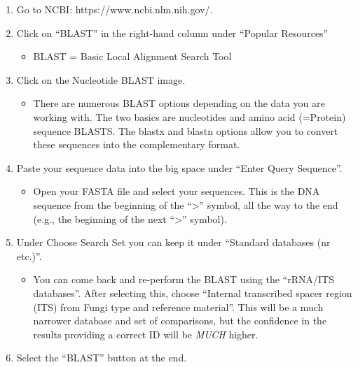 \documentclass[
  letterpaper,
  DIV=11,
  numbers=noendperiod]{scrreprt}
\providecommand{\tightlist}{%
  \setlength{\itemsep}{0pt}\setlength{\parskip}{0pt}}
\begin{document}
\begin{enumerate}
\def\labelenumi{\arabic{enumi}.}
\tightlist
\item
  Go to NCBI: https://www.ncbi.nlm.nih.gov/.
\item
  Click on ``BLAST'' in the right-hand column under ``Popular
  Resources''

  \begin{itemize}
  \tightlist
  \item
    BLAST = Basic Local Alignment Search Tool
  \end{itemize}
\item
  Click on the Nucleotide BLAST image.

  \begin{itemize}
  \tightlist
  \item
    There are numerous BLAST options depending on the data you are
    working with. The two basics are nucleotides and amino acid
    (=Protein) sequence BLASTS. The blastx and blastn options allow you
    to convert these sequences into the complementary format.
  \end{itemize}
\item
  Paste your sequence data into the big space under ``Enter Query
  Sequence''.

  \begin{itemize}
  \tightlist
  \item
    Open your FASTA file and select your sequences. This is the DNA
    sequence from the beginning of the ``\textgreater{}'' symbol, all
    the way to the end (e.g., the beginning of the next
    ``\textgreater{}'' symbol).
  \end{itemize}
\item
  Under Choose Search Set you can keep it under ``Standard databases (nr
  etc.)''.

  \begin{itemize}
  \tightlist
  \item
    You can come back and re-perform the BLAST using the ``rRNA/ITS
    databases''. After selecting this, choose ``Internal transcribed
    spacer region (ITS) from Fungi type and reference material''. This
    will be a much narrower database and set of comparisons, but the
    confidence in the results providing a correct ID will be \emph{MUCH}
    higher.
  \end{itemize}
\item
  Select the ``BLAST'' button at the end.


\end{enumerate}
\end{document}
